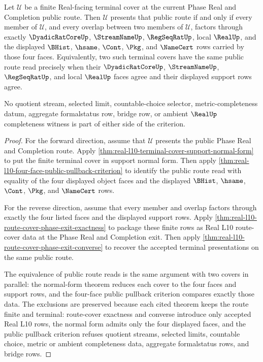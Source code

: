 \begin{theorem}
\label{thm:real-l10-terminal-route-support-bicriterion}
Let $\mathcal{U}$ be a finite Real-facing terminal cover at the current Phase
Real and Completion public route. Then $\mathcal{U}$ presents that public
route if and only if every member of $\mathcal{U}$, and every overlap between
two members of $\mathcal{U}$, factors through exactly
$\DyadicRatCoreUp$, $\StreamNameUp$, $\RegSeqRatUp$, local $\RealUp$, and the
displayed $\BHist$, $\hsame$, $\Cont$, $\Pkg$, and $\NameCert$ rows carried by
those four faces. Equivalently, two such terminal covers have the same public
route read precisely when their $\DyadicRatCoreUp$, $\StreamNameUp$,
$\RegSeqRatUp$, and local $\RealUp$ faces agree and their displayed support
rows agree.

No quotient stream, selected limit, countable-choice selector,
metric-completeness datum, aggregate formalstatus row, bridge row, or ambient
$\RealUp$ completeness witness is part of either side of the criterion.
\end{theorem}
\begin{proof}
For the forward direction, assume that $\mathcal{U}$ presents the public
Phase Real and Completion route. Apply
\autoref{thm:real-l10-terminal-cover-support-normal-form} to put the finite
terminal cover in support normal form. Then apply
\autoref{thm:real-l10-four-face-public-pullback-criterion} to identify the
public route read with equality of the four displayed object faces and the
displayed $\BHist$, $\hsame$, $\Cont$, $\Pkg$, and $\NameCert$ rows.

For the reverse direction, assume that every member and overlap factors
through exactly the four listed faces and the displayed support rows. Apply
\autoref{thm:real-l10-route-cover-phase-exit-exactness} to package these
finite rows as Real L10 route-cover data at the Phase Real and Completion
exit. Then apply
\autoref{thm:real-l10-route-cover-phase-exit-converse} to recover the
accepted terminal presentations on the same public route.

The equivalence of public route reads is the same argument with two covers in
parallel: the normal-form theorem reduces each cover to the four faces and
support rows, and the four-face public pullback criterion compares exactly
those data. The exclusions are preserved because each cited theorem keeps the
route finite and terminal: route-cover exactness and converse introduce only
accepted Real L10 rows, the normal form admits only the four displayed faces,
and the public pullback criterion refuses quotient streams, selected limits,
countable choice, metric or ambient completeness data, aggregate formalstatus
rows, and bridge rows.
\end{proof}

